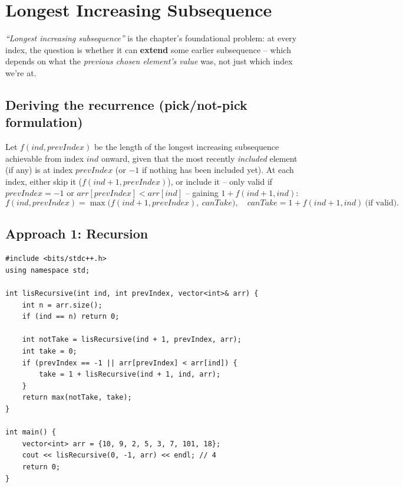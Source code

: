\section{Longest Increasing Subsequence}
\label{sec:dp-lis}


\begin{patternbox}
\emph{``Longest increasing subsequence''} is the chapter's foundational
problem: at every index, the question is whether it can \textbf{extend}
some earlier subsequence -- which depends on what the \emph{previous
chosen element's value} was, not just which index we're at.
\end{patternbox}

\subsection*{Deriving the recurrence (pick/not-pick formulation)}

Let $f(\textit{ind}, \textit{prevIndex})$ be the length of the longest
increasing subsequence achievable from index $\textit{ind}$ onward,
given that the most recently \emph{included} element (if any) is at
index $\textit{prevIndex}$ (or $-1$ if nothing has been included yet).
At each index, either skip it ($f(\textit{ind}{+}1, \textit{prevIndex})$),
or include it -- only valid if $\textit{prevIndex}=-1$ or
$\textit{arr}[\textit{prevIndex}] < \textit{arr}[\textit{ind}]$ -- gaining
$1 + f(\textit{ind}{+}1, \textit{ind})$:
\[
  f(\textit{ind}, \textit{prevIndex}) = \max\Big(
  f(\textit{ind}{+}1, \textit{prevIndex}),\ \textit{canTake} \Big), \quad
  \textit{canTake} = 1 + f(\textit{ind}{+}1, \textit{ind})\ \text{(if valid)}.
\]

\subsection*{Approach 1: Recursion}

\begin{lstlisting}
#include <bits/stdc++.h>
using namespace std;

int lisRecursive(int ind, int prevIndex, vector<int>& arr) {
    int n = arr.size();
    if (ind == n) return 0;

    int notTake = lisRecursive(ind + 1, prevIndex, arr);
    int take = 0;
    if (prevIndex == -1 || arr[prevIndex] < arr[ind]) {
        take = 1 + lisRecursive(ind + 1, ind, arr);
    }
    return max(notTake, take);
}

int main() {
    vector<int> arr = {10, 9, 2, 5, 3, 7, 101, 18};
    cout << lisRecursive(0, -1, arr) << endl; // 4
    return 0;
}
\end{lstlisting}

